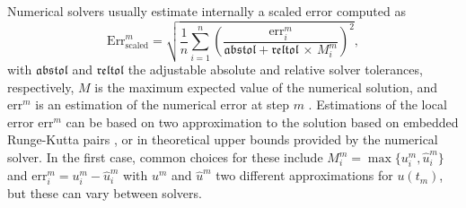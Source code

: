 
Numerical solvers usually estimate internally a scaled error computed as 
\begin{equation}
    \text{Err}_\text{scaled}^{m}
    =
    \sqrt{
    \frac{1}{n} \sum_{i=1}^n \left( \frac{\text{err}_i^{m}}{\mathfrak{abstol} + \mathfrak{reltol} \, \times \, M^m_i} \right)^2 },
    \label{eq:internal-norm-wrong}
\end{equation}
with $\mathfrak{abstol}$ and $\mathfrak{reltol}$ the adjustable absolute and relative solver tolerances, respectively, $M$ is the maximum expected value of the numerical solution, and $\text{err}^m$ is an estimation of the numerical error at step $m$ \cite{hairer-solving-1, Rackauckas_Nie_2016}. 
Estimations of the local error $\text{err}^{m}$ can be based on two approximation to the solution based on embedded Runge-Kutta pairs \cite{Ranocha_Dalcin_Parsani_Ketcheson_2022, hairer-solving-1}, or in theoretical upper bounds provided by the numerical solver. 
In the first case, common choices for these include $M^m_i = \max \{ u_i^{m}, \hat u_i^{m} \}$ and $\text{err}_i^{m} = u_i^{m} - \hat u_i^{m}$ with $u^m$ and $\hat u^m$ two different approximations for $u(t_m)$, but these can vary between solvers. 

